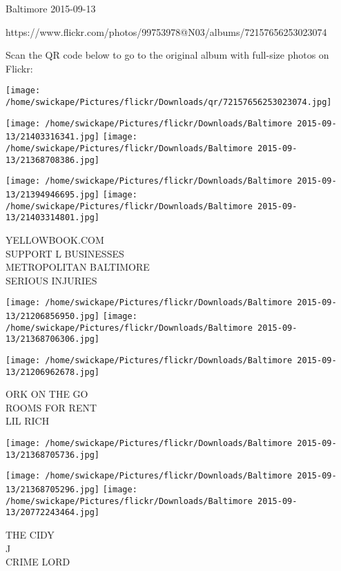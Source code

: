 \documentclass[10pt,letterpaper]{article}
\begin{document}
Baltimore 2015-09-13

https://www.flickr.com/photos/99753978@N03/albums/72157656253023074

Scan the QR code below to go to the original album with full-size photos on Flickr:

\texttt{[image: /home/swickape/Pictures/flickr/Downloads/qr/72157656253023074.jpg]}
\pagebreak

\texttt{[image: /home/swickape/Pictures/flickr/Downloads/Baltimore 2015-09-13/21403316341.jpg]}
\texttt{[image: /home/swickape/Pictures/flickr/Downloads/Baltimore 2015-09-13/21368708386.jpg]}

\texttt{[image: /home/swickape/Pictures/flickr/Downloads/Baltimore 2015-09-13/21394946695.jpg]}
\texttt{[image: /home/swickape/Pictures/flickr/Downloads/Baltimore 2015-09-13/21403314801.jpg]}

YELLOWBOOK.COM\\
SUPPORT L BUSINESSES\\
METROPOLITAN BALTIMORE\\
SERIOUS INJURIES\\
\pagebreak

\texttt{[image: /home/swickape/Pictures/flickr/Downloads/Baltimore 2015-09-13/21206856950.jpg]}
\texttt{[image: /home/swickape/Pictures/flickr/Downloads/Baltimore 2015-09-13/21368706306.jpg]}

\vspace{0.25in}
\texttt{[image: /home/swickape/Pictures/flickr/Downloads/Baltimore 2015-09-13/21206962678.jpg]}

ORK ON THE GO\\
ROOMS FOR RENT\\
LIL RICH\\
\pagebreak

\texttt{[image: /home/swickape/Pictures/flickr/Downloads/Baltimore 2015-09-13/21368705736.jpg]}

\vspace{0.25in}
\texttt{[image: /home/swickape/Pictures/flickr/Downloads/Baltimore 2015-09-13/21368705296.jpg]}
\texttt{[image: /home/swickape/Pictures/flickr/Downloads/Baltimore 2015-09-13/20772243464.jpg]}

THE CIDY\\
J\\
CRIME LORD\\
\pagebreak
\end{document}
